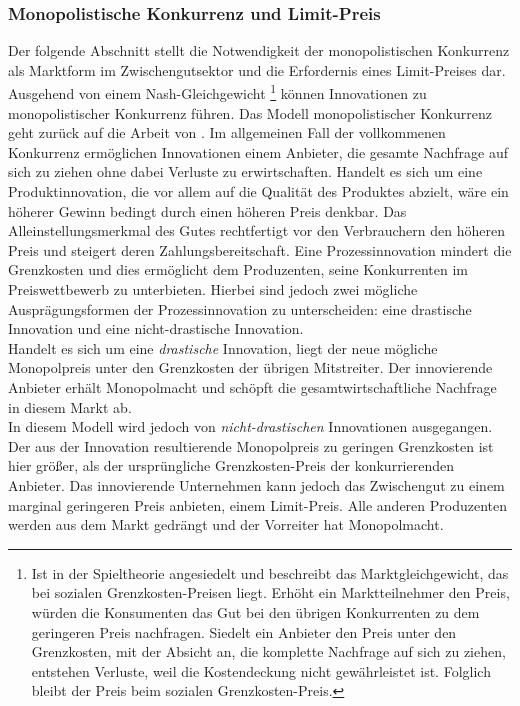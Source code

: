 \subsubsection{Monopolistische Konkurrenz und Limit-Preis}\label{sec:LimitPreis}
%
Der folgende Abschnitt stellt die Notwendigkeit der monopolistischen Konkurrenz als Marktform im Zwischengutsektor und die Erfordernis eines Limit-Preises dar.\\
%
Ausgehend von einem Nash-Gleichgewicht \footnote{Ist in der Spieltheorie angesiedelt und beschreibt das Marktgleichgewicht, das bei sozialen Grenzkosten-Preisen liegt. Erhöht ein Marktteilnehmer den Preis, würden die Konsumenten das Gut bei den übrigen Konkurrenten zu dem geringeren Preis nachfragen. Siedelt ein Anbieter den Preis unter den Grenzkosten, mit der Absicht an, die komplette Nachfrage auf sich zu ziehen, entstehen Verluste, weil die Kostendeckung nicht gewährleistet ist. Folglich bleibt der Preis beim sozialen Grenzkosten-Preis.} können Innovationen zu monopolistischer Konkurrenz führen. Das Modell monopolistischer Konkurrenz geht zurück auf die Arbeit von \cite{Dixit.1977}. Im allgemeinen Fall der vollkommenen Konkurrenz ermöglichen Innovationen einem Anbieter, die gesamte Nachfrage auf sich zu ziehen ohne dabei Verluste zu erwirtschaften. Handelt es sich um eine Produktinnovation, die vor allem auf die Qualität des Produktes abzielt, wäre ein höherer Gewinn bedingt durch einen höheren Preis denkbar. Das Alleinstellungsmerkmal des Gutes rechtfertigt vor den Verbrauchern den höheren Preis und steigert deren Zahlungsbereitschaft. Eine Prozessinnovation mindert die Grenzkosten und dies ermöglicht dem Produzenten, seine Konkurrenten im Preiswettbewerb zu unterbieten. Hierbei sind jedoch zwei mögliche Ausprägungsformen der Prozessinnovation zu unterscheiden:  eine drastische Innovation und eine nicht-drastische Innovation.\\
%
Handelt es sich um eine \textit{drastische} Innovation, liegt der neue mögliche Monopolpreis unter den Grenzkosten der übrigen Mitstreiter. Der innovierende Anbieter erhält Monopolmacht und schöpft die gesamtwirtschaftliche Nachfrage in diesem Markt ab.\\
%
In diesem Modell wird jedoch von \textit{nicht-drastischen} Innovationen ausgegangen. Der aus der Innovation resultierende Monopolpreis zu geringen Grenzkosten ist hier größer, als der ursprüngliche  Grenzkosten-Preis der konkurrierenden Anbieter. Das innovierende Unternehmen kann jedoch das Zwischengut zu einem marginal geringeren Preis anbieten, einem Limit-Preis. Alle anderen Produzenten werden aus dem Markt gedrängt und der Vorreiter hat Monopolmacht. \\
